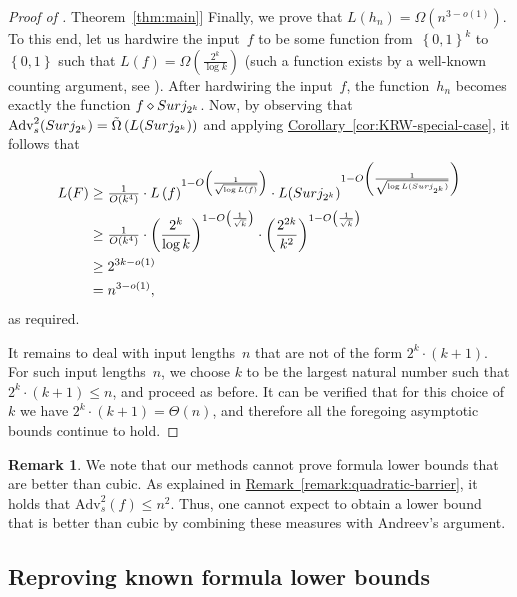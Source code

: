 \documentclass[11pt]{article}
\numberwithin{equation}{section}
\theoremstyle{definition}
\newtheorem{remark}[theorem]{Remark}
\theoremstyle{plain}
\newcommand{\expref}[2]{\hyperref[#2]{#1~\ref{#2}}}
\theoremstyle{definition}\newtheorem{notation}[theorem]{Notation}\theoremstyle{plain}
\newcommand{\B}{\left\{ 0,1 \right \}}
\newcommand{\surj}{\textup{\textsf{Surj}}}
\newcommand{\Am}{\mathrm{Adv}_{s}}
\renewcommand{\d}{\diamond}
\theoremstyle{definition}
\theoremstyle{plain}
\begin{document}
\begin{proof}[Proof of \expref{Theorem}{thm:main}]
Finally, we prove that $L(h_{n})=\Omega(n^{3-o(1)})$. To this end,
let us hardwire the input~$f$ to be some function from~$\B^{k}$
to $\B$ such that $L(f)=\Omega(\frac{2^{k}}{\log k})$ (such a function
exists by a well-known counting argument, see \cite[Theorem 1.23]{JuknaBook}).
After hardwiring the input~$f$, the function~$h_{n}$ becomes exactly
the function $f\d\surj_{2^{k}}$. Now, by observing that $\Am^{2}(\surj_{2^{k}})=\tilde{\Omega}\left(L(\surj_{2^{k}})\right)$
and applying \expref{Corollary}{cor:KRW-special-case}, it follows that 
\begin{align*}
L(F) & \ge\tfrac{1}{O(k^{4})}\cdot L\left(f\right)^{1-O\left(\frac{1}{\sqrt{\log L(f)}}\right)}\cdot L(\surj_{2^{k}})^{1-O\left(\frac{1}{\sqrt{\log L(\surj_{2^{k}})}}\right)}\\
 & \ge\tfrac{1}{O(k^{4})}\cdot\left(\frac{2^{k}}{\log k}\right)^{1-O\left(\frac{1}{\sqrt{k}}\right)}\cdot\left(\frac{2^{2k}}{k^{2}}\right)^{1-O\left(\frac{1}{\sqrt{k}}\right)}\\
 & \ge2^{3k-o(1)}\\
 & =n^{3-o(1)},
\end{align*}
as required.

It remains to deal with input lengths~$n$ that are not of the form
$2^{k}\cdot(k+1)$. For such input lengths~$n$, we choose $k$ to
be the largest natural number such that $2^{k}\cdot(k+1)\le n$, and
proceed as before. It can be verified that for this choice of~$k$
we have $2^{k}\cdot(k+1)=\Theta(n)$, and therefore all the
foregoing asymptotic bounds continue to hold. 
\end{proof}
\begin{remark}
We note that our methods cannot prove formula lower bounds that are
better than cubic. As explained in \expref{Remark}{remark:quadratic-barrier}, 
it holds
that %
$\Am^2(f) \le n^{2}$.   %
Thus, one cannot expect
to obtain a lower bound that is better than cubic by combining these
measures with Andreev's argument. 
\end{remark}


\subsection{\label{subsec:known-results}Reproving known formula lower bounds}
\end{document}

